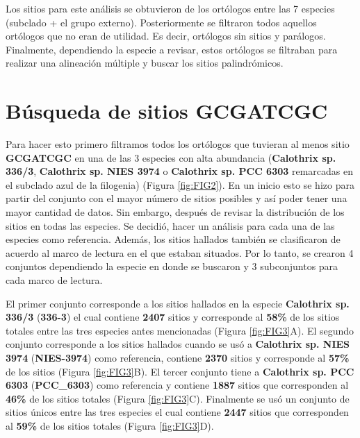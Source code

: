 \documentclass[
]{book}
\begin{document}
Los sitios para este análisis se obtuvieron de los ortólogos entre las 7 especies (subclado + el grupo externo). Posteriormente se filtraron todos aquellos ortólogos que no eran de utilidad. Es decir, ortólogos sin sitios y parálogos. Finalmente, dependiendo la especie a revisar, estos ortólogos se filtraban para realizar una alineación múltiple y buscar los sitios palindrómicos.

\hypertarget{buxfasqueda-de-sitios-gcgatcgc}{%
\section{Búsqueda de sitios GCGATCGC}\label{buxfasqueda-de-sitios-gcgatcgc}}

Para hacer esto primero filtramos todos los ortólogos que tuvieran al menos sitio \textbf{GCGATCGC} en una de las 3 especies con alta abundancia (\textbf{Calothrix sp. 336/3}, \textbf{Calothrix sp. NIES 3974} o \textbf{Calothrix sp. PCC 6303} remarcadas en el subclado azul de la filogenia) (Figura \ref{fig:FIG2}). En un inicio esto se hizo para partir del conjunto con el mayor número de sitios posibles y así poder tener una mayor cantidad de datos. Sin embargo, después de revisar la distribución de los sitios en todas las especies. Se decidió, hacer un análisis para cada una de las especies como referencia. Además, los sitios hallados también se clasificaron de acuerdo al marco de lectura en el que estaban situados. Por lo tanto, se crearon 4 conjuntos dependiendo la especie en donde se buscaron y 3 subconjuntos para cada marco de lectura.

El primer conjunto corresponde a los sitios hallados en la especie \textbf{Calothrix sp. 336/3} (\textbf{336-3}) el cual contiene \textbf{2407} sitios y corresponde al \textbf{58\%} de los sitios totales entre las tres especies antes mencionadas (Figura \ref{fig:FIG3}A). El segundo conjunto corresponde a los sitios hallados cuando se usó a \textbf{Calothrix sp. NIES 3974} (\textbf{NIES-3974}) como referencia, contiene \textbf{2370} sitios y corresponde al \textbf{57\%} de los sitios (Figura \ref{fig:FIG3}B). El tercer conjunto tiene a \textbf{Calothrix sp. PCC 6303} (\textbf{PCC\_6303}) como referencia y contiene \textbf{1887} sitios que corresponden al \textbf{46\%} de los sitios totales (Figura \ref{fig:FIG3}C). Finalmente se usó un conjunto de sitios únicos entre las tres especies el cual contiene \textbf{2447} sitios que corresponden al \textbf{59\%} de los sitios totales (Figura \ref{fig:FIG3}D).
\end{document}
